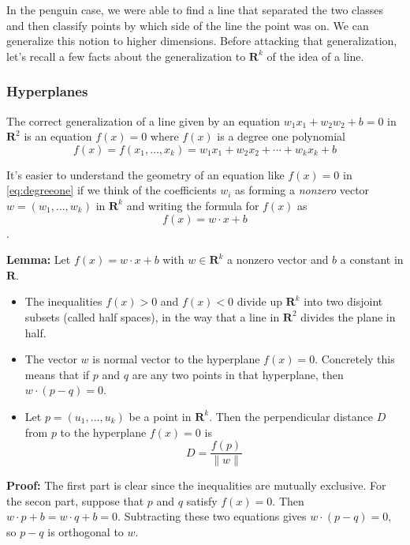 \documentclass[
]{article}
\providecommand{\tightlist}{%
  \setlength{\itemsep}{0pt}\setlength{\parskip}{0pt}}
\begin{document}
In the penguin case, we were able to find a line that separated the two
classes and then classify points by which side of the line the point was
on. We can generalize this notion to higher dimensions. Before attacking
that generalization, let's recall a few facts about the generalization
to \(\mathbf{R}^{k}\) of the idea of a line.

\hypertarget{hyperplanes}{%
\subsubsection{Hyperplanes}\label{hyperplanes}}

The correct generalization of a line given by an equation
\(w_1 x_1+ w_2 w_2+b=0\) in \(\mathbf{R}^{2}\) is an equation \(f(x)=0\)
where \(f(x)\) is a degree one polynomial \begin{equation}
f(x) = f(x_1,\ldots, x_k) = w_1 x_1 + w_2 x_2 +\cdots + w_k x_k + b 
\label{eq:degreeone}\end{equation}

It's easier to understand the geometry of an equation like \(f(x)=0\) in
\cref{eq:degreeone} if we think of the coefficients \(w_i\) as forming a
\emph{nonzero} vector \(w = (w_1,\ldots, w_k)\) in \(\mathbf{R}^{k}\)
and writing the formula for \(f(x)\) as \[
f(x) = w\cdot x +b
\].

\textbf{Lemma:} Let \(f(x)=w\cdot x+b\) with \(w\in\mathbf{R}^{k}\) a
nonzero vector and \(b\) a constant in \(\mathbf{R}\).

\begin{itemize}
\tightlist
\item
  The inequalities \(f(x)>0\) and \(f(x)<0\) divide up
  \(\mathbf{R}^{k}\) into two disjoint subsets (called half spaces), in
  the way that a line in \(\mathbf{R}^{2}\) divides the plane in half.
\item
  The vector \(w\) is normal vector to the hyperplane \(f(x)=0\).
  Concretely this means that if \(p\) and \(q\) are any two points in
  that hyperplane, then \(w\cdot (p-q)=0\).
\item
  Let \(p=(u_1,\ldots,u_k)\) be a point in \(\mathbf{R}^{k}\). Then the
  perpendicular distance \(D\) from \(p\) to the hyperplane \(f(x)=0\)
  is \[
  D = \frac{f(p)}{\|w\|}
  \]
\end{itemize}

\textbf{Proof:} The first part is clear since the inequalities are
mutually exclusive. For the secon part, suppose that \(p\) and \(q\)
satisfy \(f(x)=0\). Then \(w\cdot p+b = w\cdot q+b=0\). Subtracting
these two equations gives \(w\cdot (p-q)=0\), so \(p-q\) is orthogonal
to \(w\).
\end{document}

